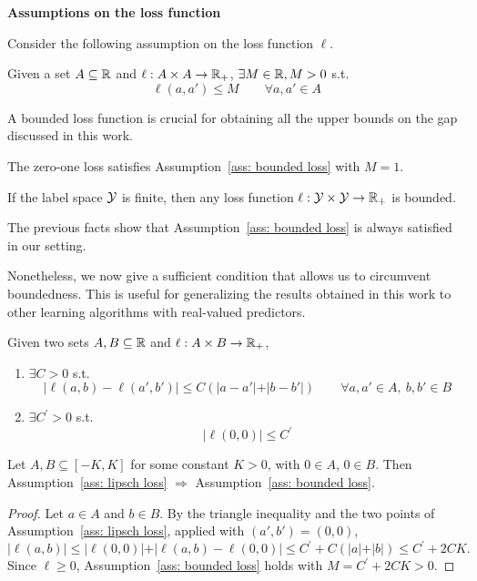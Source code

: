 \documentclass[reqno]{amsart}
\begin{document}
{\bf Assumptions on the loss function}

Consider the following assumption on the loss function $\ell$. 

\begin{assumption}\label{ass: bounded loss}
    Given a set $A\subseteq\mathbb{R}$ and $\ell:A\times A\to\mathbb{R}_+$,
    $\exists M\in\mathbb{R}, M >0$ s.t.
    \[
    \ell (a,a') \le M \qquad \forall a,a'\in A 
    \]
\end{assumption}

A bounded loss function is crucial for obtaining all the upper bounds on the gap discussed in this work. 

\begin{fact}
    The zero-one loss satisfies Assumption~\ref{ass: bounded loss} with $M=1$.
\end{fact}

\begin{fact}
  If the label space $\mathcal{Y}$ is finite, then any loss function $\ell:\mathcal{Y}\times\mathcal{Y}\to\mathbb{R}_+$ is bounded.  
\end{fact}

The previous facts show that Assumption~\ref{ass: bounded loss} is always satisfied in our setting. 

Nonetheless, we now give a sufficient condition that allows us to circumvent boundedness. This is useful for generalizing the results obtained in this work to other learning algorithms with real-valued predictors.

\begin{assumption}\label{ass: lipsch loss}
Given two sets $A,B\subseteq\mathbb{R}$ and $\ell:A\times B\to\mathbb{R}_+$, 
    \begin{enumerate}
        \item $\exists C>0$ s.t.
        \[ \vert \ell(a,b)-\ell(a',b')\vert \le C\left(\vert a-a'\vert + \vert b-b'\vert\right) \qquad \forall a,a'\in A,\ b,b' \in B\]

        \item $\exists C^\prime >0$ s.t.
        \[ \vert \ell(0,0)\vert \le C^\prime
        \]
    \end{enumerate}
\end{assumption}

\begin{proposition}\label{prop: suff assump}
    Let $A,B\subseteq[-K,K]$ for some constant $K>0$, with $0\in A$, $0\in B$. Then Assumption~\ref{ass: lipsch loss} $\Rightarrow$ Assumption~\ref{ass: bounded loss}. 

    \begin{proof}
    Let $a\in A$ and $b\in B$. By the triangle inequality and the two points of Assumption~\ref{ass: lipsch loss}, applied with $(a',b')=(0,0)$,
    \[
    \vert\ell(a,b)\vert \le \vert\ell(0,0)\vert + \vert\ell(a,b)-\ell(0,0)\vert \le C^\prime + C\left(\vert a\vert+\vert b\vert\right) \le C^\prime + 2CK.
    \]
    Since $\ell\ge0$, Assumption~\ref{ass: bounded loss} holds with $M = C^\prime+2CK>0$.
    \end{proof}
\end{proposition}
\end{document}
